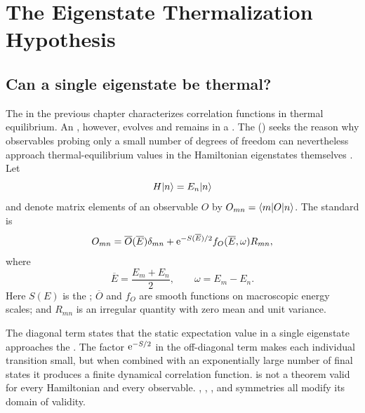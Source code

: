 \chapter{The Eigenstate Thermalization\\ Hypothesis}
\label{chap:eth}

\section{Can a single eigenstate be thermal?}

The  in the previous chapter characterizes correlation functions in thermal equilibrium. An , however, evolves  and remains in a . The  () seeks the reason why observables probing only a small number of degrees of freedom can nevertheless approach thermal-equilibrium values in the Hamiltonian eigenstates themselves \cite{Deutsch:1991,Srednicki:1994,Rigol:2008,DAlessio:2016}.
Let
\begin{equation}
H\lvert n \rangle
=
E_n\lvert n \rangle
\end{equation}
and denote matrix elements of an observable $O$ by $O_{mn}=\langle m \rvert O\lvert n \rangle$. The standard  is
\begin{equation}
O_{mn}
=
\overline O(\overline E)\delta_{mn}
+\mathrm{e}^{-S(\overline E)/2}
f_O(\overline E,\omega)R_{mn},
\label{eq:eth-ansatz}
\end{equation}
where
\begin{equation}
\overline E
=
\frac{E_m+E_n}{2},
\qquad
\omega
=
E_m-E_n.
\end{equation}
Here $S(E)$ is the ; $\overline O$ and $f_O$ are smooth functions on macroscopic energy scales; and $R_{mn}$ is an irregular quantity with zero mean and unit variance.

The diagonal term states that the static expectation value in a single eigenstate approaches the . The factor $\mathrm{e}^{-S/2}$ in the off-diagonal term makes each individual transition small, but when combined with an exponentially large number of final states it produces a finite dynamical correlation function.  is not a theorem valid for every Hamiltonian and every observable. , , , and symmetries all modify its domain of validity.

